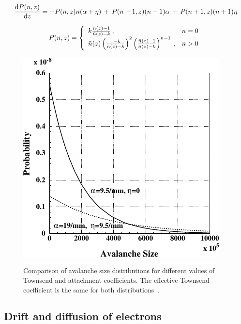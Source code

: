 	\begin{equation}
	\label{eq:dRLV}
	\frac{\mathrm{d}{P(n,z)}}{\mathrm{d}{z}} = -P(n,z)n(\alpha+\eta) \, + \, P(n-1,z)(n-1)\alpha \, + \, P(n+1,z)(n+1)\eta
	\end{equation}
	
	\begin{equation}
	\label{eq:sol-RLV}
	P(n,z) = \left\{
				\begin{array}{l l}
  				k\frac{\bar{n}(z)-1}{\bar{n}(z)-k} \, , & n=0\\
  				\bar{n}(z) \left( \frac{1-k}{\bar{n}(z)-k} \right)^2 \left( \frac{\bar{n}(z)-1}{\bar{n}(z)-k} \right)^{n-1} \, , & n>0\\
  				\end{array} \right.
	\end{equation}
	
	\begin{figure}[H]
		\centering
		\includegraphics[width = 0.7\plotwidth]{fig/chapt4/Riegler-distrib.pdf}\\
		\caption{\label{fig:RVL} Comparison of avalanche size distributions for different values of Townsend and attachment coefficients. The effective Townsend coefficient is the same for both distributions~\cite{RIEGLER2003}.}
	\end{figure}
		
	\subsection{Drift and diffusion of electrons}
	\label{chapt4:ssec:electrons}
	
